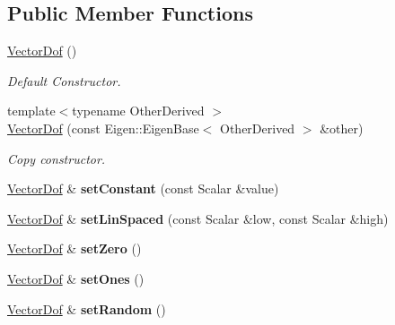\subsection*{Public Member Functions}
\begin{DoxyCompactItemize}
\item 
\hyperlink{classow__core_1_1VectorDof_a488ac8cc1bfe0683f6d348eca855735d}{Vector\+Dof} ()\hypertarget{classow__core_1_1VectorDof_a488ac8cc1bfe0683f6d348eca855735d}{}\label{classow__core_1_1VectorDof_a488ac8cc1bfe0683f6d348eca855735d}

\begin{DoxyCompactList}\small\item\em Default Constructor. \end{DoxyCompactList}\item 
{\footnotesize template$<$typename Other\+Derived $>$ }\\\hyperlink{classow__core_1_1VectorDof_a52fb1369e02f8b20b6510f6bdef6ca12}{Vector\+Dof} (const Eigen\+::\+Eigen\+Base$<$ Other\+Derived $>$ \&other)
\begin{DoxyCompactList}\small\item\em Copy constructor. \end{DoxyCompactList}\item 
\hyperlink{classow__core_1_1VectorDof}{Vector\+Dof} \& {\bfseries set\+Constant} (const Scalar \&value)\hypertarget{classow__core_1_1VectorDof_acd67ace1b66bed1d51c0762dc62ba9a7}{}\label{classow__core_1_1VectorDof_acd67ace1b66bed1d51c0762dc62ba9a7}

\item 
\hyperlink{classow__core_1_1VectorDof}{Vector\+Dof} \& {\bfseries set\+Lin\+Spaced} (const Scalar \&low, const Scalar \&high)\hypertarget{classow__core_1_1VectorDof_a85cb5a00ad47f5d9046780b4e63271ac}{}\label{classow__core_1_1VectorDof_a85cb5a00ad47f5d9046780b4e63271ac}

\item 
\hyperlink{classow__core_1_1VectorDof}{Vector\+Dof} \& {\bfseries set\+Zero} ()\hypertarget{classow__core_1_1VectorDof_adb9403a5726589146cec53b98ce27a50}{}\label{classow__core_1_1VectorDof_adb9403a5726589146cec53b98ce27a50}

\item 
\hyperlink{classow__core_1_1VectorDof}{Vector\+Dof} \& {\bfseries set\+Ones} ()\hypertarget{classow__core_1_1VectorDof_a079291e0d1a46a048066ca31a4c52d7b}{}\label{classow__core_1_1VectorDof_a079291e0d1a46a048066ca31a4c52d7b}

\item 
\hyperlink{classow__core_1_1VectorDof}{Vector\+Dof} \& {\bfseries set\+Random} ()\hypertarget{classow__core_1_1VectorDof_a788e7aaeffb52db4a9fcb14ad84fc6eb}{}\label{classow__core_1_1VectorDof_a788e7aaeffb52db4a9fcb14ad84fc6eb}


\end{DoxyCompactItemize}
